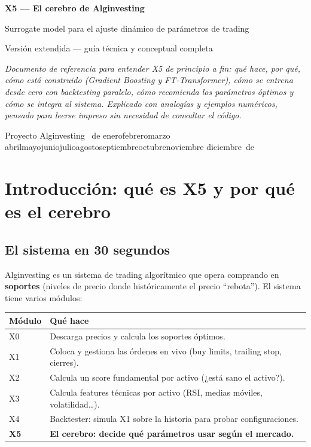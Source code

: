 \documentclass[11pt,a4paper]{report}
\renewcommand{\today}{\number\day\ de \ifcase\month\or enero\or febrero\or marzo\or
  abril\or mayo\or junio\or julio\or agosto\or septiembre\or octubre\or noviembre\or
  diciembre\fi\ de \number\year}
\begin{document}
\begin{titlepage}
\centering
\vspace*{2.5cm}
{\Huge\bfseries\color{cazul} X5 — El cerebro de Alginvesting\par}
\vspace{0.6cm}
{\Large Surrogate model para el ajuste dinámico de parámetros de trading\par}
\vspace{0.4cm}
{\large\color{cgris} Versión extendida — guía técnica y conceptual completa\par}
\vspace{2cm}
\begin{minipage}{0.8\textwidth}\color{cgris}\small\itshape
Documento de referencia para entender X5 de principio a fin: qué hace, por qué,
cómo está construido (Gradient Boosting y FT-Transformer), cómo se entrena desde
cero con backtesting paralelo, cómo recomienda los parámetros óptimos y cómo se
integra al sistema. Explicado con analogías y ejemplos numéricos, pensado para
leerse impreso sin necesidad de consultar el código.
\end{minipage}
\vfill
{\color{cgris} Proyecto Alginvesting \quad\textbullet\quad \today}
\end{titlepage}

\tableofcontents
\thispagestyle{empty}

\chapter{Introducción: qué es X5 y por qué es el cerebro}

\section{El sistema en 30 segundos}

Alginvesting es un sistema de trading algorítmico que opera comprando en \textbf{soportes}
(niveles de precio donde históricamente el precio ``rebota''). El sistema tiene varios módulos:

\begin{center}
\begin{tabular}{@{}ll@{}}
\toprule
\textbf{Módulo} & \textbf{Qué hace} \\
\midrule
X0 & Descarga precios y calcula los soportes óptimos. \\
X1 & Coloca y gestiona las órdenes en vivo (buy limits, trailing stop, cierres). \\
X2 & Calcula un score fundamental por activo (¿está sano el activo?). \\
X3 & Calcula features técnicas por activo (RSI, medias móviles, volatilidad\ldots). \\
X4 & Backtester: simula X1 sobre la historia para probar configuraciones. \\
\textbf{X5} & \textbf{El cerebro: decide qué parámetros usar según el mercado.} \\
\bottomrule
\end{tabular}
\end{center}
\end{document}

